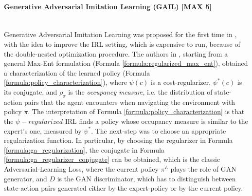 \paragraph{Generative Adversarial Imitation Learning (GAIL) [MAX 5]} \mbox{} \\
\label{para:gail}
Generative Adversarial Imitation Learning was proposed for the first time in \cite{ho2016gail}, with the idea to improve the IRL setting, which is expensive to run, because of the double-nested optimization procedure. The authors in \cite{ho2016gail}, starting from a general Max-Ent formulation (Formula \ref{formula:regularized_max_ent}), obtained a characterization of the learned policy (Formula \ref{formula:policy_characterization}), where $\psi(c)$ is a cost-regularizer, $\psi^{*}(c)$ is its conjugate, and $\rho_{\pi}$ is the \textit{occupancy measure}, i.e. the distribution of state-action pairs that the agent encounters when navigating the environment with policy $\pi$. The interpretation of Formula \ref{formula:policy_characterization} is that the $\psi-regularized$ IRL finds a policy whose occupancy measure is similar to the expert's one, measured by $\psi^{*}$. The next-step was to choose an appropriate regularization function. In particular, by choosing the regularizer in Formula \ref{formula:ga_regularization}, the conjugate in Formula \ref{formula:ga_regularizer_conjugate} can be obtained, which is the classic Adversarial-Learning Loss, where the current policy $\pi^{L}$ plays the role of GAN generator, and $D$ is the GAN discriminator, which has to distinguish between state-action pairs generated either by the expert-policy or by the current policy.
